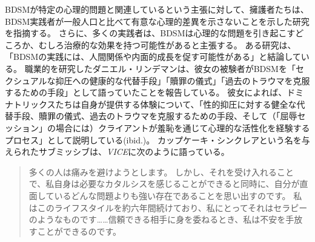 \documentclass[paper=a4,book,openany]{jlreq}
\begin{document}
BDSMが特定の心理的問題と関連しているという主張に対して、擁護者たちは、BDSM実践者が一般人口と比べて有意な心理的差異を示さないことを示した研究を指摘する\citep{hebert14:_examin_person_charac_assoc_bdsm_orien,powls12:_descr_review_resear_relat_sadom}。
さらに、多くの実践者は、BDSMは心理的な問題を引き起こすどころか、むしろ治療的な効果を持つ可能性があると主張する。
ある研究は、「BDSMの実践には、人間関係や内面的成長を促す可能性がある」と結論している\citep[pp.157-158]{weille02:_psych_consen_sadom_domin_submis_sexual_games}。
職業的を研究したダニエル・リンデマンは、彼女の被験者がBDSMを「セクシュアルな抑圧への健康的な代替手段」「贖罪の儀式」「過去のトラウマを克服するための手段」として語っていたことを報告している\citep[p.157]{lindemann11:_bdsm_therap}。
彼女によれば、ドミナトリックスたちは自身が提供する体験について、「性的抑圧に対する健全な代替手段、贖罪の儀式、過去のトラウマを克服するための手段、そして（「屈辱セッション」の場合には）クライアントが羞恥を通じて心理的な活性化を経験するプロセス」として説明している(ibid.)。
カップケーキ・シンクレアという名を与えられたサブミッシブは、\emph{VICE}に次のように語っている。

\begin{quote}
多くの人は痛みを避けようとします。
しかし、それを受け入れることで、私自身は必要なカタルシスを感じることができると同時に、自分が直面しているどんな問題よりも強い存在であることを思い出すのです。
私はこのライフスタイルを約六年間続けており、私にとってそれはセラピーのようなものです……信頼できる相手に身を委ねるとき、私は不安を手放すことができるのです。
\citep{barrett-ibarria17:_bsdm_can_provid_profoun_healin_exper}
\end{quote}
\end{document}
